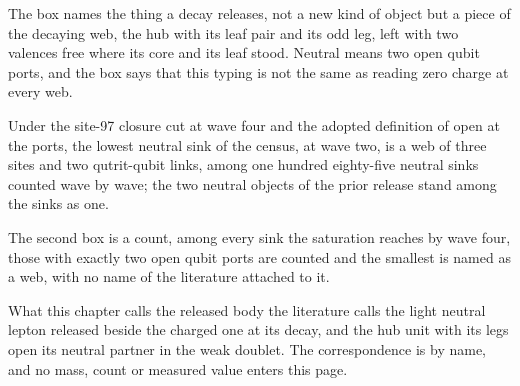 The box names the thing a decay releases, not a new kind of object but a piece of the decaying web, the hub with its leaf pair and its odd leg, left with two valences free where its core and its leaf stood. Neutral means two open qubit ports, and the box says that this typing is not the same as reading zero charge at every web.
\begin{chconditional}\label{box:VI-2b-neutral-lepton-the-hub-unit-with-its-legs-open:2}
Under the site-97 closure cut at wave four and the adopted definition of open at the ports, the lowest neutral sink of the census, at wave two, is a web of three sites and two qutrit-qubit links, among one hundred eighty-five neutral sinks counted wave by wave; the two neutral objects of the prior release stand among the sinks as one.
\end{chconditional}
The second box is a count, among every sink the saturation reaches by wave four, those with exactly two open qubit ports are counted and the smallest is named as a web, with no name of the literature attached to it.
\begin{chbridge}
What this chapter calls the released body the literature calls the light neutral lepton released beside the charged one at its decay, and the hub unit with its legs open its neutral partner in the weak doublet. The correspondence is by name, and no mass, count or measured value enters this page.
\end{chbridge}
